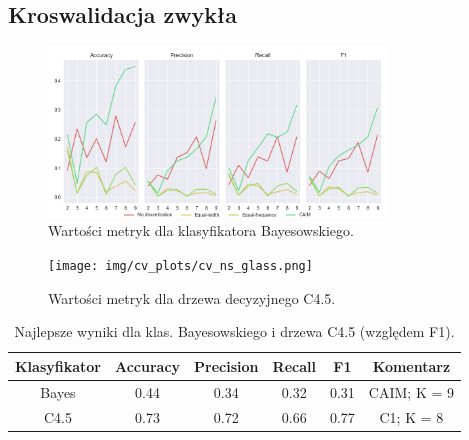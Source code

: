 \subsection*{Kroswalidacja zwykła}

\begin{figure}[H]
\center
    \includegraphics[width=0.8\textwidth]{img/cv_scores_kfold/scoring_kfold_glass.png}
    \caption{Wartości metryk dla klasyfikatora Bayesowskiego.}
\end{figure}

\begin{figure}[H]
    \center
    \texttt{[image: img/cv\_plots/cv\_ns\_glass.png]}
    \caption{Wartości metryk dla drzewa decyzyjnego C4.5.}
\end{figure}


\begin{table}[H]
  \center
  \begin{tabular}{|c|c|c|c|c|c|}
    \hline
    Klasyfikator & Accuracy & Precision & Recall & F1 & Komentarz \\ \hline
    Bayes        & 0.44     & 0.34      & 0.32   & 0.31 & CAIM; K = 9 \\ \hline
    C4.5         & 0.73     & 0.72      & 0.66   & 0.77 & C1; K = 8 \\ \hline
  \end{tabular}

  \caption{Najlepsze wyniki dla klas. Bayesowskiego i drzewa C4.5 (względem F1).}
\end{table}

